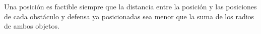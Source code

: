 Una posición es factible siempre que la distancia entre la posición y las posiciones de cada obstáculo y defensa ya posicionadas sea menor que la suma de los radios de ambos objetos.
